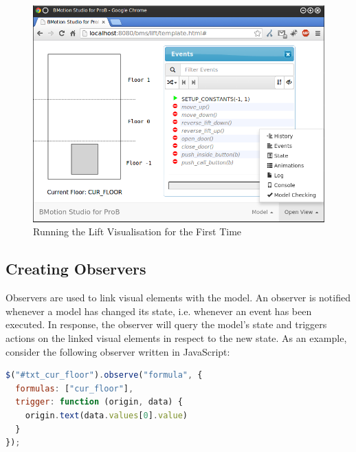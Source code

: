 \begin{figure}[!ht]
\begin{center}
	\includegraphics[width=12cm]{img/tutorial/tut_03.png}
	\caption{Running the Lift Visualisation for the First Time}
	\label{fig_tut_03_running1}
\end{center}
\end{figure}

\subsection{Creating Observers}
\label{sec_creation_observers}

Observers are used to link visual elements with the model. 
An observer is notified whenever a model has changed its state, i.e. whenever an event has been executed. 
In response, the observer will query the model's state and triggers actions on the linked visual elements in respect to the new state.
As an example, consider the following observer written in JavaScript:

\begin{lstlisting}[float=ht,language=JavaScript, caption={Formula Observer Displaying the Current Floor (JavaScript)}]
$("#txt_cur_floor").observe("formula", {
  formulas: ["cur_floor"],
  trigger: function (origin, data) {
    origin.text(data.values[0].value)
  }
});
\end{lstlisting}

